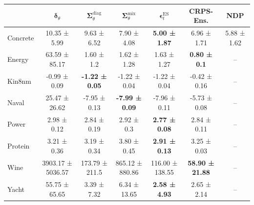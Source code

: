 \begin{tabular}{l|c|c|c|c|c|c}
\toprule
 & $\bm\delta_\theta$ & $\bm\Sigma_\theta^{\mathrm{diag}}$ & $\bm\Sigma_\theta^{\mathrm{mix}}$ & $\bm\epsilon_t^\mathrm{ES}$ & CRPS-Ens. & NDP \\
\midrule
Concrete & 10.35 ± 5.99 & 9.63 ± 6.52 & 7.90 ± 4.08 & \textbf{5.00 ± 1.87} & 6.96 ± 1.71 & 5.88 ± 1.62 \\
Energy & 63.59 ± 85.17 & 1.60 ± 1.2 & 1.62 ± 1.28 & 1.63 ± 1.27 & \textbf{0.80 ± 0.1} & -- \\
Kin8nm & -0.99 ± 0.09 & \textbf{-1.22 ± 0.05} & -1.22 ± 0.04 & -1.22 ± 0.04 & -0.42 ± 0.16 & -- \\
Naval & 25.47 ± 26.62 & -7.95 ± 0.13 & \textbf{-7.99 ± 0.09} & -7.96 ± 0.11 & -5.73 ± 0.08 & -- \\
Power & 2.98 ± 0.12 & 2.84 ± 0.19 & 2.92 ± 0.3 & \textbf{2.77 ± 0.08} & 2.84 ± 0.11 & -- \\
Protein & 3.21 ± 0.36 & 3.19 ± 0.34 & 3.80 ± 0.45 & \textbf{2.91 ± 0.13} & 3.25 ± 0.03 & -- \\
Wine & 3903.17 ± 5036.57 & 173.79 ± 211.5 & 865.12 ± 880.86 & 116.00 ± 138.55 & \textbf{58.90 ± 21.88} & -- \\
Yacht & 55.75 ± 65.65 & 3.39 ± 7.32 & 6.34 ± 13.65 & \textbf{2.58 ± 4.93} & 2.65 ± 2.14 & -- \\
\bottomrule
\end{tabular}
